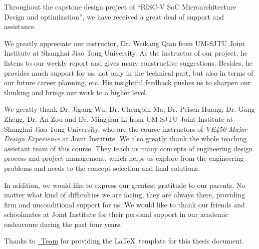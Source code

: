 
\begin{acknowledgements}

Throughout the capstone design project of ``RISC-V SoC Microarchitecture Design and optimization'', we have received a great deal of support and assistance.

We greatly appreciate our instructor, Dr. Weikang Qian from UM-SJTU Joint Institute at Shanghai Jiao Tong University. As the instructor of our project, he listens to our weekly report and gives many constructive suggestions. Besides, he provides much support for us, not only in the technical part, but also in terms of our future career planning, etc. His insightful feedback pushes us to sharpen our thinking and brings our work to a higher level.

We greatly thank Dr. Jigang Wu, Dr. Chengbin Ma, Dr. Peisen Huang, Dr. Gang Zheng, Dr. An Zou and Dr. Mingjian Li from UM-SJTU Joint Institute at Shanghai Jiao Tong University, who are the course instructors of \textit{VE450 Major Design Experience} at Joint Institute. We also greatly thank the whole teaching assistant team of this course. They teach us many concepts of engineering design process and project management, which helps us explore from the engineering problems and needs to the concept selection and final solutions.

In addition, we would like to express our greatest gratitude to our parents. No matter what kind of difficulties we are facing, they are always there, providing firm and unconditional support for us. We would like to thank our friends and schoolmates at Joint Institute for their personal support in our academic endeavours during the past four years.

Thanks to \href{https://github.com/sjtug/SJTUThesis}{\sjtuthesis~Team} for providing the \LaTeX~template for this thesis document.

\end{acknowledgements}
